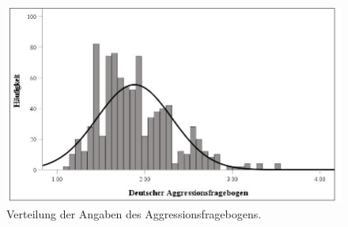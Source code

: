 \begin{figure}[htb!]
    \centering
        \includegraphics[width=0.8\linewidth]{Histogramm AggroFB.jpg}
        \caption[Histogramm Aggressionsfragebogen]{Verteilung der Angaben des Aggressionsfragebogens.}
        \label{Histogramm AggroFB}
\end{figure}

